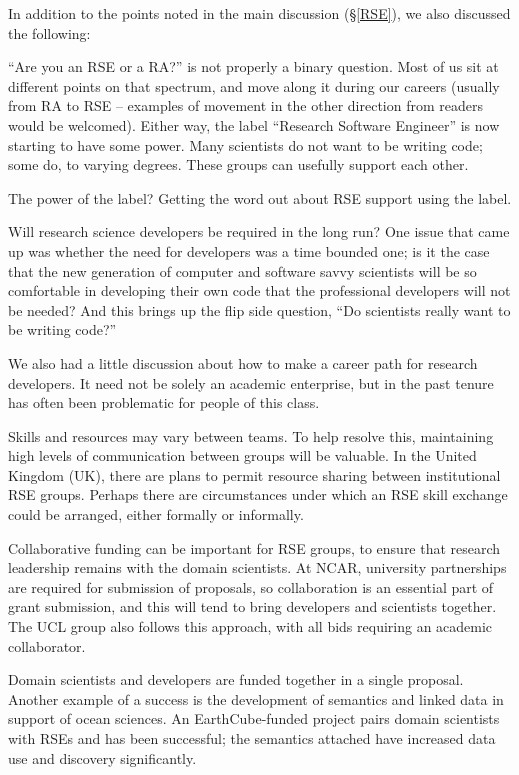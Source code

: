 In addition to the points noted in the main discussion (\S\ref{RSE}), we also
discussed the following:

``Are you an RSE or a RA?'' is not properly a binary question. Most of
us sit at different points on that spectrum, and move along it during our
careers (usually from RA to RSE -- examples of movement in the other direction
from readers would be welcomed). Either way, the label ``Research Software
Engineer'' is now starting to have some power. Many scientists do not want to be
writing code; some do, to varying degrees. These groups can usefully support
each other.

The power of the label? Getting the word out about RSE support using the label. 

Will research science developers be required in the long run? One issue that
came up was whether the need for developers was a time bounded one; is it the
case that the new generation of computer and software savvy scientists will be
so comfortable in developing their own code that the professional developers will
not be needed? And this brings up the flip side question, ``Do scientists really
want to be writing code?''

We also had a little discussion about how to make a career path for
research developers. It need not be solely an academic enterprise, but in the
past tenure has often been problematic for people of this class.

Skills and resources may vary between teams. To help resolve this, maintaining
high levels of communication between groups will be valuable. In the United Kingdom (UK), there
are plans to permit resource sharing between institutional RSE groups. Perhaps
there are circumstances under which an RSE skill exchange could be arranged,
either formally or informally.

Collaborative funding can be important for RSE groups, to ensure that research
leadership remains with the domain scientists. At NCAR, university partnerships
are required for submission of proposals, so collaboration is an essential part
of grant submission, and this will tend to bring developers and scientists
together. The UCL group also follows this approach, with all bids requiring an
academic collaborator.

Domain scientists and developers are funded together in a single proposal.
Another example of a success is the development of semantics and linked data in
support of ocean sciences. An EarthCube-funded project pairs domain scientists
with RSEs and has been successful; the semantics attached have increased data
use and discovery significantly.

